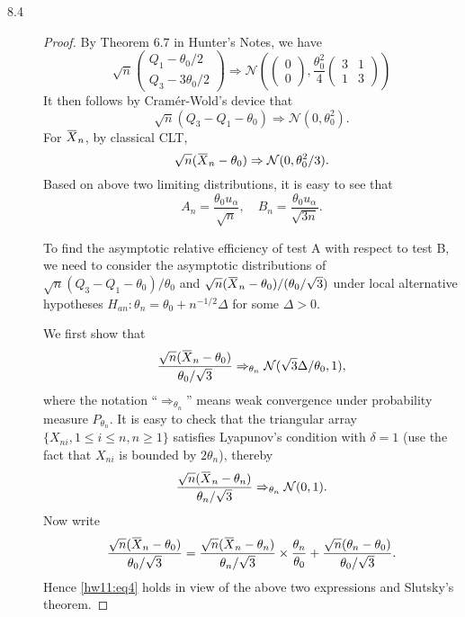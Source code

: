 \documentclass{article}
\newcommand{\overbar}[1]{\mkern 1.5mu\overline{\mkern-1.5mu#1\mkern-1.5mu}\mkern 1.5mu}
\newcommand{\gaussian}{\mathcal{N}}
\theoremstyle{definition}
\theoremstyle{plain}
\theoremstyle{remark}
\begin{document}
\begin{description}
\item[8.4]
\begin{proof}
By Theorem $6.7$ in Hunter's Notes, we have
\begin{equation*}
    \sqrt{n}\begin{pmatrix} Q_1 - \theta_0/2 \\ Q_3 - 3\theta_0/2 \end{pmatrix}
    \Rightarrow
    \gaussian\left(\begin{pmatrix} 0 \\ 0 \end{pmatrix}, \frac{\theta_0^2}{4}
    \begin{pmatrix}
    3 & 1 \\
    1 & 3
    \end{pmatrix}\right)
\end{equation*}
It then follows by Cram\'{e}r-Wold's device that 
\begin{equation*}
    \sqrt{n}(Q_3 - Q_1 - \theta_0) \Rightarrow \gaussian(0, \theta_0^2).
\end{equation*}
For $\overbar{X}_n$, by classical CLT,
\begin{equation*}
    \sqrt{n}(\overbar{X}_n - \theta_0) \Rightarrow \gaussian(0, \theta_0^2/3).
\end{equation*}
Based on above two limiting distributions, it is easy to see that 
$$A_n = \frac{\theta_0 u_\alpha}{\sqrt{n}}, \quad B_n = \frac{\theta_0 u_\alpha}{\sqrt{3n}}.$$

To find the asymptotic relative efficiency of test A with respect to test B, we need to
consider the asymptotic distributions of $\sqrt{n}(Q_3 - Q_1 - \theta_0)/\theta_0$ and 
$\sqrt{n}(\overbar{X}_n - \theta_0)/(\theta_0/\sqrt{3})$ under local alternative hypotheses $H_{an}: \theta_n = \theta_0 + n^{-1/2}\Delta$ for some $\Delta > 0$. 

We first show that
\begin{equation}\label{hw11:eq4}
\frac{\sqrt{n}(\overbar{X}_n - \theta_0)}{\theta_0/\sqrt{3}} \Rightarrow_{\theta_n} \gaussian(\sqrt{3}\Delta/\theta_0, 1),
\end{equation}
where the notation ``$\Rightarrow_{\theta_n}$'' means weak convergence under
probability measure $P_{\theta_n}$. It is easy to check that the triangular array
$\{X_{ni}, 1 \leq i \leq n, n \geq 1\}$ satisfies Lyapunov's condition with $\delta 
= 1$ (use the fact that $X_{ni}$ is bounded by $2\theta_n$), thereby 
$$\frac{\sqrt{n}(\overbar{X}_n - \theta_n)}{\theta_n/\sqrt{3}} \Rightarrow_{\theta_n} \gaussian(0, 1).$$
Now write
$$\frac{\sqrt{n}(\overbar{X}_n - \theta_0)}{\theta_0/\sqrt{3}} = \frac{\sqrt{n}(\overbar{X}_n - \theta_n)}{\theta_n/\sqrt{3}} \times \frac{\theta_n}{\theta_0} +
\frac{\sqrt{n}(\theta_n - \theta_0)}{\theta_0/\sqrt{3}}.$$
Hence \eqref{hw11:eq4} holds in view of the above two expressions and Slutsky's 
theorem.


\end{proof}
\end{description}
\end{document}
